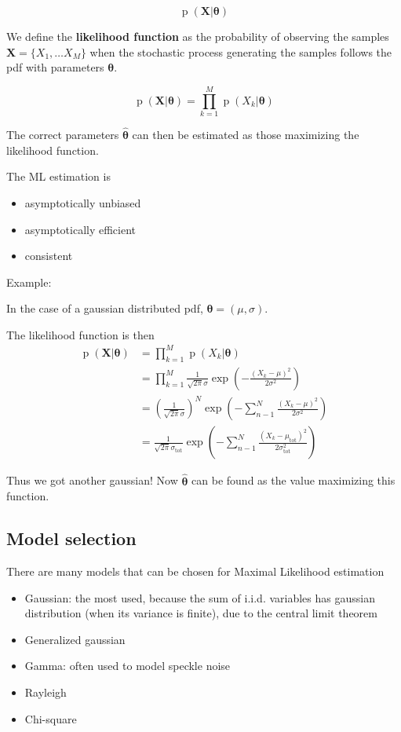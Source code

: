 \documentclass[oneside,onecolumn]{report}
\DeclareMathOperator*{\pdf}{p}
\begin{document}
$$ \pdf(\bm X | \bm \theta) $$

We define the \textbf{likelihood function} as the probability of observing the samples $\bm X = \{X_1, \dots X_M\}$ when the stochastic process generating the samples follows the pdf with parameters $\bm \theta$.

$$ \pdf(\bm X | \bm \theta) = \prod_{k = 1}^M \pdf(X_k | \bm \theta) $$

The correct parameters $\bm{\widehat \theta}$ can then be estimated as those maximizing the likelihood function.

The ML estimation is
\begin{itemize}
    \item asymptotically unbiased
    \item asymptotically efficient
    \item consistent
\end{itemize}


Example:

In the case of a gaussian distributed pdf, $\bm \theta = (\mu, \sigma)$.

The likelihood function is then
\begin{align*}
    \pdf(\bm X| \bm \theta)
    &= \prod_{k = 1}^M \pdf(X_k | \bm \theta) \\
    &= \prod_{k = 1}^M \frac{1}{\sqrt{2 \pi} \sigma} \exp( -\frac{(X_k - \mu)^2}{2 \sigma^2}) \\
    &= \left(\frac{1}{\sqrt{2 \pi} \sigma}\right)^N \exp( - \sum_{n -1}^N \frac{(X_k - \mu)^2}{2 \sigma^2}) \\
    &=  \frac{1}{\sqrt{2 \pi} \sigma_\text{tot}} \exp( - \sum_{n -1}^N \frac{(X_k - \mu_\text{tot})^2}{2 \sigma_\text {tot}^2} )
\end{align*}

Thus we got another gaussian! Now $\bm{\widehat \theta}$ can be found as the value maximizing this function.

\subsection{Model selection}

There are many models that can be chosen for Maximal Likelihood estimation
\begin{itemize}
    \item Gaussian: the most used, because the sum of i.i.d. variables has gaussian distribution (when its variance is finite), due to the central limit theorem
    \item Generalized gaussian
    \item Gamma: often used to model speckle noise
    \item Rayleigh
    \item Chi-square
\end{itemize}
\end{document}
